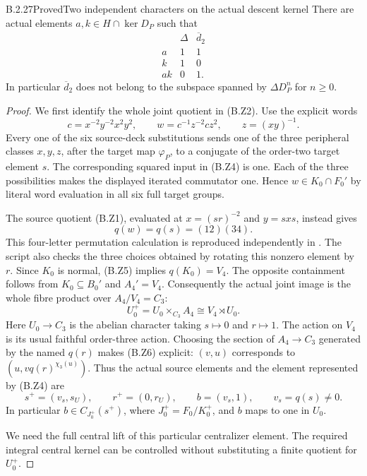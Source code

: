 \begin{result}{B.2.27}{Proved}{Two independent characters on the actual descent kernel}
There are actual elements $a,k\in H\cap\ker D_P$ such that
\[
 \begin{array}{c|cc}
       &\Delta&\overline d_2\\\hline
 a     &1&1\\
 k     &1&0\\
 ak    &0&1.
 \end{array}
 \tag{B.Z3}
\]
In particular $\overline d_2$ does not belong to the
subspace spanned by $\Delta D_P^n$ for $n\geq0$.
\end{result}
\begin{proof}
We first identify the whole joint quotient in (B.Z2).
Use the explicit words
\[
 c=x^{-2}y^{-2}x^2y^2,\qquad
 w=c^{-1}z^{-2}cz^2,\qquad z=(xy)^{-1}.
 \tag{B.Z4}
\]
Every one of the six source-deck substitutions sends
one of the three peripheral classes $x,y,z$, after
the target map $\varphi_P$, to a conjugate of the
order-two target element $s$.  The corresponding
squared input in (B.Z4) is one.  Each of the three
possibilities makes the displayed iterated commutator
one.  Hence $w\in K_0\cap F_0'$ by literal word
evaluation in all six full target groups.

The source quotient (B.Z1), evaluated at
$x=(sr)^{-2}$ and $y=sxs$, instead gives
\[
                         q(w)=q(s)=(12)(34).
 \tag{B.Z5}
\]
This four-letter permutation calculation is reproduced
independently in .
The script also checks the three choices obtained by
rotating this nonzero element by $r$.  Since $K_0$ is
normal, (B.Z5) implies $q(K_0)=V_4$.  The opposite
containment follows from $K_0\subseteq B_0'$ and
$A_4'=V_4$.  Consequently the actual joint image is
the whole fibre product over $A_4/V_4=C_3$:
\[
 U_0^+=U_0\mathbin{\times}_{C_3}A_4
            \cong V_4\rtimes U_0.
 \tag{B.Z6}
\]
Here $U_0\to C_3$ is the abelian character taking
$s\mapsto0$ and $r\mapsto1$.  The action on $V_4$
is its usual faithful order-three action.  Choosing
the section of $A_4\to C_3$ generated by the named
$q(r)$ makes (B.Z6) explicit: $(v,u)$ corresponds
to $(u,vq(r)^{\chi_3(u)})$.  Thus the actual source
elements and the element represented by (B.Z4) are
\[
 s^+=(v_s,s_U),\qquad r^+=(0,r_U),\qquad
 b=(v_s,1),\qquad v_s=q(s)\ne0.
 \tag{B.Z7}
\]
In particular $b\in C_{J_0^+}(s^+)$, where
$J_0^+=F_0/K_0^+$, and $b$ maps to one in $U_0$.

We need the full central lift of this particular
centralizer element.  The required integral central
kernel can be controlled without substituting a
finite quotient for $U_0^+$.


\end{proof}
